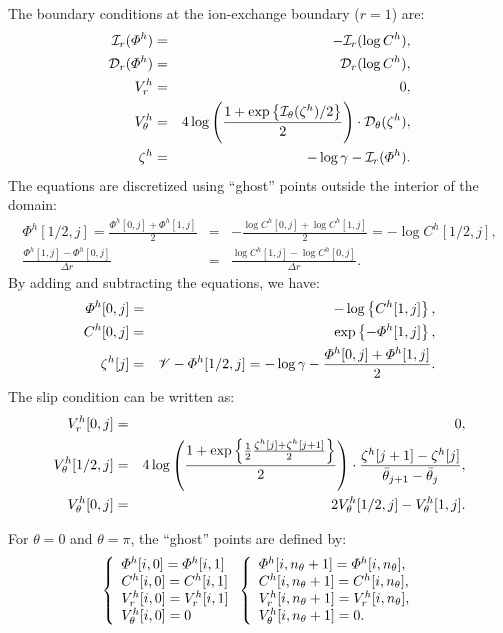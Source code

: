 The boundary conditions at the ion-exchange boundary ($r=1$) are:
\begin{eqnarray}
\cI_r(\varPhi^h) &=& -\cI_r(\log C^h), \\
\cD_r(\varPhi^h) &=& \cD_r(\log C^h), \\
V^h_r &=& 0, \\
V^h_\theta &=& 4\log\pars{\frac{1 + \exp\left\{\cI_\theta(\zeta^h)/2\right\}}{2}} \cdot 
			\cD_\theta(\zeta^h), \\
  \zeta^h &=& - \log \gamma - \cI_r(\varPhi^h).
\end{eqnarray}
The equations are discretized using ``ghost'' points outside the interior of the domain:
\begin{eqnarray}
 \varPhi^h[1/2, j] = \frac{\varPhi^h[0,j] + \varPhi^h[1,j]}{2} &=& 
	-\frac{\log C^h[0,j] + \log C^h[1,j]}{2} = -\log C^h[1/2, j], \\
  \frac{\varPhi^h[1,j] - \varPhi^h[0,j]}{\Delta r} &=& 
	\frac{\log C^h[1,j] - \log C^h[0,j]}{\Delta r}. 
\end{eqnarray}
By adding and subtracting the equations, we have:
\begin{eqnarray}
\varPhi^h[0,j] &=& -\log\brcs{C^h[1,j]}, \\
C^h[0,j] &=& \exp\brcs{-\varPhi^h[1,j]}, \\
  \zeta^h[j] &=& \cV - \varPhi^h[1/2,j]
                     = -\log\gamma -\frac{\varPhi^h[0,j] + \varPhi^h[1,j]}{2}.
\end{eqnarray}
The slip condition can be written as:
\begin{eqnarray}
V_r^h[0,j] &=& 0, \\
V_\theta^h[1/2,j] &=& 
4\log\pars{\frac{1 + \exp\left\{\frac{1}{2}
 \frac{\zeta^h[j] + \zeta^h[j+1]}{2}\right\}}{2}} 
\cdot \frac{\zeta^h[j+1] - \zeta^h[j]}{\bar{\theta}_{j+1} - \bar{\theta}_{j}}, \\
  V^h_\theta[0,j] &=& 2 V^h_\theta[1/2, j] - V^h_\theta[1,j].
\end{eqnarray}

For $\theta = 0$ and $\theta = \pi$, the ``ghost'' points are defined by:
\begin{eqnarray} 
\brc{l}{
\varPhi^h[i, 0] = \varPhi^h[i, 1] \\
C^h[i, 0] = C^h[i, 1] \\
V_r^h[i, 0] = V_r^h[i, 1] \\
V_\theta^h[i, 0] = 0
} 
\brc{l}{
\varPhi^h[i, n_\theta+1] = \varPhi^h[i, n_\theta], \\
C^h[i, n_\theta+1] = C^h[i, n_\theta], \\
V_r^h[i, n_\theta+1] = V_r^h[i, n_\theta], \\
V_\theta^h[i, n_\theta+1] = 0.
} 
\end{eqnarray}

